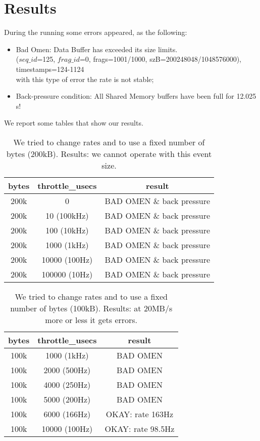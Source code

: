 \documentclass[12pt]{article}
\begin{document}
\section{Results}
During the running some errors appeared, as the following:
\begin{itemize}
    \item Bad Omen: Data Buffer has exceeded its size limits.
    \\
    ($seq\_id$=125, $frag\_id$=0, frags=1001/1000, szB=200248048/1048576000), timestamps=124-1124
    \\
    with this type of error the rate is not stable;
    \item Back-pressure condition: All Shared Memory buffers have been full for 12.025 s!
\end{itemize}
 We report some tables that show our results. 
\begin{center}  
\begin{table}[!h]
\centering
\begin{tabular}{c c c}
\hline
bytes & throttle\_usecs &  result\\
\hline
200k & 0 & BAD OMEN \& back pressure \\
200k & 10 (100kHz) & BAD OMEN \& back pressure \\
200k & 100 (10kHz) & BAD OMEN \& back pressure\\
200k & 1000 (1kHz) & BAD OMEN \& back pressure \\
200k & 10000 (100Hz) & BAD OMEN \& back pressure \\
200k & 100000 (10Hz) & BAD OMEN \& back pressure\\
\end{tabular}
\caption{We tried to change rates and to use a fixed number of bytes (200kB). Results: we cannot operate with this event size.}
\end{table}\label{tab:upperlimits}
\end{center}
\begin{center}  
\begin{table}[!h]
\centering
\begin{tabular}{c c c}
\hline
bytes & throttle\_usecs &  result\\
\hline
100k & 1000 (1kHz) & BAD OMEN \\
100k & 2000 (500Hz) & BAD OMEN \\
100k & 4000 (250Hz) & BAD OMEN \\
100k & 5000 (200Hz) & BAD OMEN \\
100k & 6000 (166Hz) & OKAY: rate 163Hz \\
100k & 10000 (100Hz) & OKAY: rate 98.5Hz \\
\end{tabular}
\caption{We tried to change rates and to use a fixed number of bytes (100kB). Results: at 20MB/s more or less it gets errors.}
\end{table}\label{tab:upperlimits}
\end{center}
\end{document}
